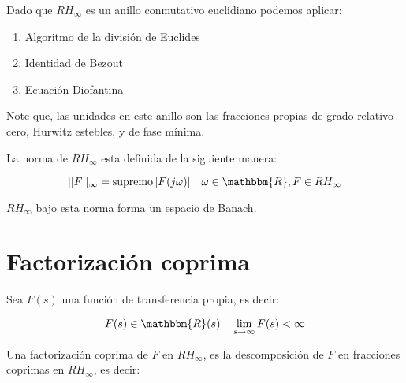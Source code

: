         Dado que $RH_{\infty}$ es un anillo conmutativo euclidiano podemos aplicar:

        \begin{enumerate}
            \item Algoritmo de la división de Euclides
            \item Identidad de Bezout
            \item Ecuación Diofantina
        \end{enumerate}

        Note que, las unidades en este anillo son las fracciones propias de grado relativo cero, Hurwitz estebles, y de fase mínima.

        \begin{definicion}
            La norma de $RH_{\infty}$ esta definida de la siguiente manera:

            \begin{equation}
                ||F||_{\infty} = \supremo{|F(j\omega)|} \quad \omega \in \mathbbm{R}, F \in RH_{\infty}
            \end{equation}

            $RH_{\infty}$ bajo esta norma forma un espacio de Banach.
        \end{definicion}




    \section{Factorización coprima}

        Sea $F(s)$ una función de transferencia propia, es decir:

        \begin{equation*}
            F(s) \in \mathbbm{R}(s) \quad \lim_{s \to \infty} F(s) < \infty
        \end{equation*}

        Una factorización coprima de $F$ en $RH_{\infty}$, es la descomposición de $F$ en fracciones coprimas en $RH_{\infty}$, es decir:

